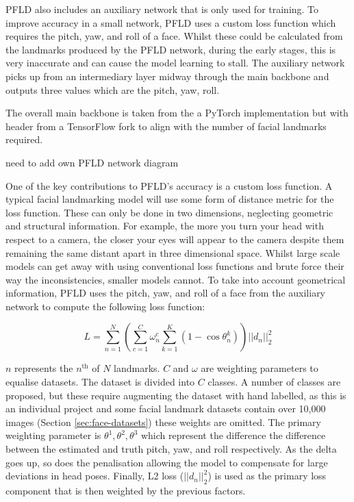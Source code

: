 PFLD also includes an auxiliary network that is only used for training. To improve accuracy in a small network, PFLD uses a custom loss function which requires the pitch, yaw, and roll of a face. Whilst these could be calculated from the landmarks produced by the PFLD network, during the early stages, this is very inaccurate and can cause the model learning to stall. The auxiliary network picks up from an intermediary layer midway through the main backbone and outputs three values which are the pitch, yaw, roll.

The overall main backbone is taken from the a PyTorch implementation\cite{zhao2019pfld} but with header from a TensorFlow fork\cite{qi2019pfld} to align with the number of facial landmarks required.
 
{\huge need to add own PFLD network diagram}

One of the key contributions to PFLD's accuracy is a custom loss function. A typical facial landmarking model will use some form of distance metric for the loss function. These can only be done in two dimensions, neglecting geometric and structural information. For example, the more you turn your head with respect to a camera, the closer your eyes will appear to the camera despite them remaining the same distant apart in three dimensional space. Whilst large scale models can get away with using conventional loss functions and brute force their way the inconsistencies, smaller models cannot. To take into account geometrical information, PFLD uses the pitch, yaw, and roll of a face from the auxiliary network to compute the following loss function:

\begin{equation}
    L =\sum^N_{n=1}\left(\sum^C_{c=1}\omega^c_n\sum^K_{k=1}(1-\cos{\theta^k_n})\right) ||d_n||^2_2
\end{equation}

$n$ represents the $n^\text{th}$ of $N$ landmarks. $C$ and $\omega$ are weighting parameters to equalise datasets. The dataset is divided into $C$ classes. A number of classes are proposed, but these require augmenting the dataset with hand labelled, as this is an individual project and some facial landmark datasets contain over 10,000 images (Section \ref{sec:face-datasets}) these weights are omitted. The primary weighting parameter is $\theta^1, \theta^2,\theta^3$ which represent the difference the difference between the estimated and truth pitch, yaw, and roll respectively. As the delta goes up, so does the penalisation allowing the model to compensate for large deviations in head poses. Finally, L2 loss ($||d_n||^2_2$) is used as the primary loss component that is then weighted by the previous factors. 

